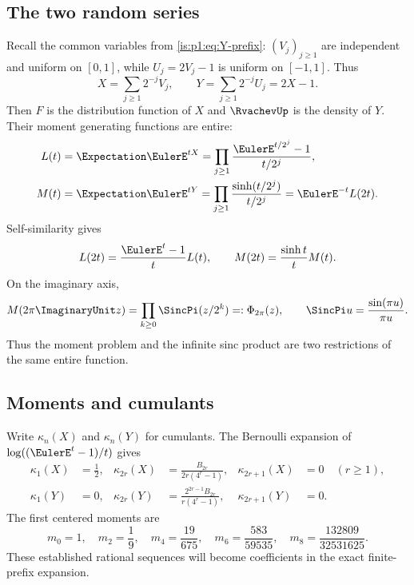 \subsection{The two random series}

Recall the common variables from \cref{is:p1:eq:Y-prefix}: $(V_j)_{j\ge1}$
are independent and uniform on $[0,1]$, while $U_j=2V_j-1$ is uniform on
$[-1,1]$.  Thus
\begin{equation}
 X=\sum_{j\ge1}2^{-j}V_j,
 \qquad
 Y=\sum_{j\ge1}2^{-j}U_j=2X-1.
 \label{is:p2:eq:XY-series}
\end{equation}
Then $F$ is the distribution function of $X$ and $\RvachevUp$ is the density of $Y$.  Their moment
generating functions are entire:
\begin{align}
 L(t)&=\Expectation\EulerE^{tX}
 =\prod_{j\ge1}\frac{\EulerE^{t/2^j}-1}{t/2^j},
 \label{is:p2:eq:L-def}\\
 M(t)&=\Expectation\EulerE^{tY}
 =\prod_{j\ge1}\frac{\sinh(t/2^j)}{t/2^j}
 =\EulerE^{-t}L(2t).
 \label{is:p2:eq:M-def}
\end{align}
Self-similarity gives
\begin{equation}
 L(2t)=\frac{\EulerE^t-1}{t}L(t),
 \qquad
 M(2t)=\frac{\sinh t}{t}M(t).
 \label{is:p2:eq:mgf-refinement}
\end{equation}
On the imaginary axis,
\begin{equation}
 M(2\pi\ImaginaryUnit z)=\prod_{k\ge0}\SincPi(z/2^k)=:\PhiCyc(z),
 \qquad \SincPi u=\frac{\sin(\pi u)}{\pi u}.
 \label{is:p2:eq:M-Phi}
\end{equation}
Thus the moment problem and the infinite sinc product are two restrictions of the same entire
function.

\subsection{Moments and cumulants}

Write $\kappa_n(X)$ and $\kappa_n(Y)$ for cumulants.  The Bernoulli expansion of
$\log((\EulerE^t-1)/t)$ gives
\begin{align}
 \kappa_1(X)&=\frac12,
 &\kappa_{2r}(X)&=\frac{B_{2r}}{2r(4^r-1)},
 &\kappa_{2r+1}(X)&=0\quad(r\ge1),
 \label{is:p2:eq:X-cumulants}\\
 \kappa_1(Y)&=0,
 &\kappa_{2r}(Y)&=\frac{2^{2r-1}B_{2r}}{r(4^r-1)},
 &\kappa_{2r+1}(Y)&=0.
 \label{is:p2:eq:Y-cumulants}
\end{align}
The first centered moments are
\begin{equation}
 m_0=1,
 \quad m_2=\frac19,
 \quad m_4=\frac{19}{675},
 \quad m_6=\frac{583}{59535},
 \quad m_8=\frac{132809}{32531625}.
 \label{is:p2:eq:Y-moments}
\end{equation}
These established rational sequences will become coefficients in the exact finite-prefix expansion.

